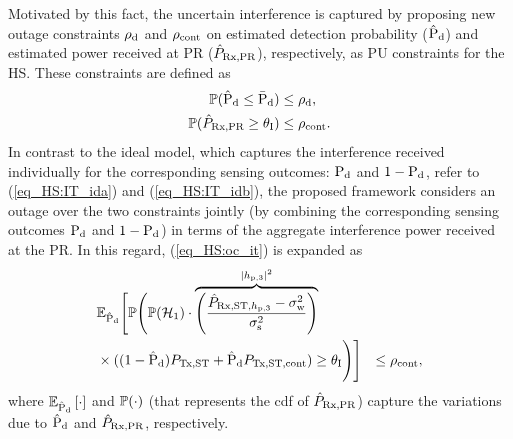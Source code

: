 Motivated by this fact, the uncertain interference is captured by proposing new outage constraints $\rho_{\text{d}}$ and $\rho_{\text{cont}}$ on estimated detection probability ($\hat{\text{P}}_{\text{d}}$) and estimated power received at PR ($\hat{P}_{\text{Rx,PR}}$), respectively, as PU constraints for the HS. These constraints are defined as  
\begin{align}
\mathbb P(\hat{\text{P}}_{\text{d}} \le \bar{\text{P}}_{\text{d}}) &\le \rho_{\text{d}} \label{eq_HS:oc_pd}, \\
\mathbb P(\hat{P}_{\text{Rx,PR}} \ge \theta_{\text{I}}) &\le \rho_{\text{cont}} \label{eq_HS:oc_it}.
\end{align}   
In contrast to the ideal model, which captures the interference received individually for the corresponding sensing outcomes: $\text{P}_{\text{d}}$ and  $1- \text{P}_{\text{d}}$, refer to (\ref{eq_HS:IT_ida}) and (\ref{eq_HS:IT_idb}), the proposed framework considers an outage over the two constraints jointly (by combining the corresponding sensing outcomes $\text{P}_{\text{d}}$ and $1 - \text{P}_{\text{d}}$) in terms of the aggregate interference power received at the PR. In this regard, (\ref{eq_HS:oc_it}) is expanded as 
\begin{align}
& \mathbb{E}_{\hat{\text{P}}_{\text{d}}} \Bigg[ \mathbb P \Bigg( \mathbb P(\mathcal{H}_1) \cdot \smash[b]{\overbrace{\left( \frac{\hat{P}_{\text{Rx,ST,$h_{\text{p,3}}$}} - \sigma^2_{\text{w}}}{\sigma^2_{\text{s}}} \right)}^{|h_{\text{p,3}}|^2}} \nonumber \\ & \times ((1 - \hat{\text{P}}_{\text{d}}) P_{\text{Tx,ST}} + \hat{\text{P}}_{\text{d}} P_{\text{Tx,ST,cont}}) \ge \theta_{\text{I}} \Bigg) \Bigg] &\le \rho_{\text{cont}} \label{eq_HS:oc_it_def}, 
\end{align}
where ${\mathbb E}_{\hat{\text{P}}_{\text{d}}}\left[ \cdot \right]$ and $\mathbb P(\cdot)$ (that represents the cdf of $\hat{P}_{\text{Rx,PR}}$) capture the variations due to $\hat{\text{P}}_{\text{d}}$ and $\hat{P}_{\text{Rx,PR}}$, respectively. 

